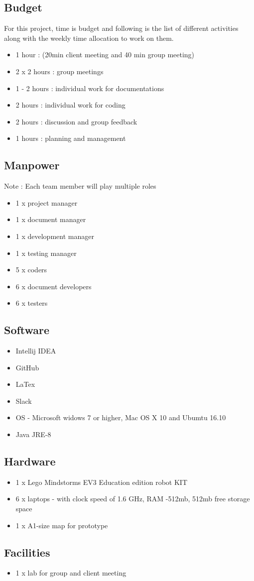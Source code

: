 \subsection{Budget}
For this project, time is budget and following is the list of different activities along with the weekly time allocation to work on them.  
\begin{itemize}
\item 1 hour  : (20min client meeting and 40 min group meeting)
\item 2 x 2 hours : group meetings 
\item 1 - 2 hours : individual work for documentations
\item 2 hours : individual work for coding 
\item 2 hours : discussion and group feedback  
\item 1 hours : planning and management
\end{itemize}

\subsection{Manpower}
Note : Each team member will play multiple roles 
\begin{itemize}
\item 1 x project manager
\item 1 x document manager
\item 1 x development manager
\item 1 x testing manager
\item 5 x coders
\item 6 x document developers
\item 6 x testers
\end{itemize}
\subsection{Software}
\begin{itemize}
\item Intellij IDEA
\item GitHub
\item LaTex
\item Slack
\item OS - Microsoft widows 7 or higher, Mac OS X 10 and Ubumtu 16.10
\item Java JRE-8
\end{itemize}

\subsection{Hardware}
\begin{itemize}
\item 1 x Lego Mindstorms EV3 Education edition robot KIT
\item 6 x laptops - with clock speed of  1.6 GHz, RAM -512mb, 512mb free storage space
\item 1 x A1-size map for prototype
\end{itemize}

\subsection{Facilities}
\begin{itemize}
\item 1 x lab for group and client meeting 
\end{itemize}
